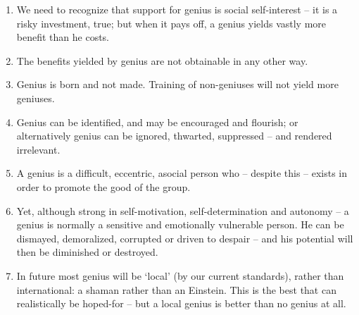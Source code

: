 \documentclass[
]{book}
\begin{document}
\begin{enumerate}
\def\labelenumi{\arabic{enumi}.}
\item
  We need to recognize that support for genius is social self-interest -- it is a risky investment, true; but when it pays off, a genius yields vastly more benefit than he costs.
\item
  The benefits yielded by genius are not obtainable in any other way.
\item
  Genius is born and not made. Training of non-geniuses will not yield more geniuses.
\item
  Genius can be identified, and may be encouraged and flourish; or alternatively genius can be ignored, thwarted, suppressed -- and rendered irrelevant.
\item
  A genius is a difficult, eccentric, asocial person who -- despite this -- exists in order to promote the good of the group.
\item
  Yet, although strong in self-motivation, self-determination and autonomy -- a genius is normally a sensitive and emotionally vulnerable person. He can be dismayed, demoralized, corrupted or driven to despair -- and his potential will then be diminished or destroyed.
\item
  In future most genius will be `local' (by our current standards), rather than international: a shaman rather than an Einstein. This is the best that can realistically be hoped-for -- but a local genius is better than no genius at all.
\end{enumerate}

  
\end{document}
